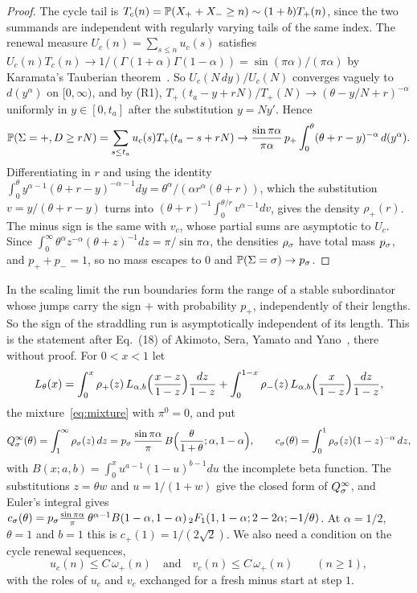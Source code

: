 \begin{proof}
The cycle tail is $T_c(n)=\mathbb{P}(X_{+}+X_{-}\ge n)\sim(1+b)T_{+}(n)$, since the two
summands are independent with regularly varying tails of the same index. The renewal
measure $U_c(n)=\sum_{s\le n}u_c(s)$ satisfies $U_c(n)T_c(n)\to1/(\Gamma(1+\alpha)\Gamma(1-\alpha))=\sin(\pi\alpha)/(\pi\alpha)$
by Karamata's Tauberian theorem~\cite[Section~XIV.3]{feller1971}. So $U_c(N\,dy)/U_c(N)$
converges vaguely to $d(y^\alpha)$ on $[0,\infty)$, and by (R1), $T_\plus(t_a-y+rN)/T_\plus(N)\to(\theta-y/N+r)^{-\alpha}$
uniformly in $y\in[0,t_a]$ after the substitution $y=Ny'$. Hence
\[
 \mathbb{P}(\Sigma={+},D\ge rN)=\sum_{s\le t_a}u_c(s)T_{+}(t_a-s+rN)
 \to\frac{\sin\pi\alpha}{\pi\alpha}\,p_{+}\int_0^\theta(\theta+r-y)^{-\alpha}\,d(y^\alpha).
\]
Differentiating in $r$ and using the identity
$\int_0^\theta y^{\alpha-1}(\theta+r-y)^{-\alpha-1}dy=\theta^\alpha/(\alpha r^\alpha(\theta+r))$, which the
substitution $v=y/(\theta+r-y)$ turns into $(\theta+r)^{-1}\int_0^{\theta/r}v^{\alpha-1}dv$, gives the
density $\rho_\plus(r)$. The minus sign is the same with $v_c$, whose partial sums are
asymptotic to $U_c$. Since $\int_0^\infty\theta^\alpha z^{-\alpha}(\theta+z)^{-1}dz=\pi/\sin\pi\alpha$, the
densities $\rho_\sigma$ have total mass $p_\sigma$, and $p_\plus+p_\minus=1$, so no mass escapes to
$0$ and $\mathbb{P}(\Sigma=\sigma)\to p_\sigma$.
\end{proof}

In the scaling limit the run boundaries form the range of a stable subordinator whose
jumps carry the sign $\plus$ with probability $p_\plus$, independently of their lengths. So
the sign of the straddling run is asymptotically independent of its length. This is the
statement after Eq.~(18) of Akimoto, Sera, Yamato and Yano~\cite{asyy2020}, there without
proof. For $0<x<1$ let
\begin{equation}\label{eq:L-theta}
 L_\theta(x)=\int_0^x\rho_{+}(z)\,L_{\alpha,b}\Bigl(\frac{x-z}{1-z}\Bigr)\frac{dz}{1-z}
 +\int_0^{1-x}\rho_{-}(z)\,L_{\alpha,b}\Bigl(\frac x{1-z}\Bigr)\frac{dz}{1-z},
\end{equation}
the mixture~\eqref{eq:mixture} with $\pi^0=0$, and put
\begin{equation}\label{eq:aged-constants}
 Q^\infty_\sigma(\theta)=\int_1^\infty\rho_\sigma(z)\,dz=p_\sigma\,\frac{\sin\pi\alpha}\pi\,B\Bigl(\frac\theta{1+\theta};\alpha,1-\alpha\Bigr),\qquad
 c_\sigma(\theta)=\int_0^1\rho_\sigma(z)(1-z)^{-\alpha}\,dz,
\end{equation}
with $B(x;a,b)=\int_0^xu^{a-1}(1-u)^{b-1}du$ the incomplete beta function. The substitutions
$z=\theta w$ and $u=1/(1+w)$ give the closed form of $Q^\infty_\sigma$, and Euler's integral gives
$c_\sigma(\theta)=p_\sigma\frac{\sin\pi\alpha}\pi\,\theta^{\alpha-1}B(1-\alpha,1-\alpha)\,{}_2F_1(1,1-\alpha;2-2\alpha;-1/\theta)$.
At $\alpha=1/2$, $\theta=1$ and $b=1$ this is $c_\plus(1)=1/(2\sqrt2)$. We also need a condition
on the cycle renewal sequences,
\begin{equation}\label{eq:U}\tag{U}
 u_c(n)\le C\,\omega_\plus(n)\quad\text{and}\quad v_c(n)\le C\,\omega_\plus(n)\qquad(n\ge1),
\end{equation}
with the roles of $u_c$ and $v_c$ exchanged for a fresh minus start at step $1$.

